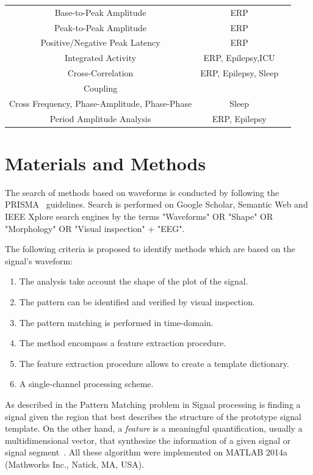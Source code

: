 \documentclass[brainsci,article,submit,moreauthors,pdftex,10pt,a4paper]{mdpi}
\begin{document}
\begin{table}[H]
\begin{tabular}{ccc}
Base-to-Peak Amplitude     & ERP  &  \citep{Cole2017} \\
Peak-to-Peak Amplitude     & ERP  &  \citep{Mak2012} \\
Positive/Negative Peak Latency                                 & ERP  & \citep{Mak2012}  \\
Integrated Activity               & ERP, Epilepsy,ICU & \citep{Uchida1999, Shah2015} \\
Cross-Correlation                & ERP, Epilepsy, Sleep & \citep{Cacioppo2007, Shah2015} \\
Coupling \\ Cross Frequency,  Phase-Amplitude, Phase-Phase     & Sleep & \citep{Cole2017} \\
Period Amplitude Analysis  & ERP, Epilepsy & \citep{Uchida1999,Cacioppo2007, Shah2015} \\
\bottomrule
\end{tabular}
\label{tab:results}
\end{table}


\section{Materials and Methods}

The search of methods based on waveforms is conducted by following the PRISMA~\citep{Moher2009} guidelines.  Search is performed on Google Scholar, Semantic Web and IEEE Xplore search engines by the terms "Waveforms" OR "Shape" OR "Morphology" OR "Visual inspection" + "EEG".

The following criteria is proposed to identify methods which are based on the signal's waveform:

\begin{enumerate}
\item The analysis take account the shape of the plot of the signal.
\item The pattern can be identified and verified by visual inspection.
\item The pattern matching is performed in time-domain.
\item The method encompass a feature extraction procedure.
\item The feature extraction procedure allows to create a template dictionary.
\item A single-channel processing scheme.
\end{enumerate}

As described in \citep{allen2004signal} the Pattern Matching problem in Signal processing is finding a signal given the region that best describes the structure of the prototype signal template.   On the other hand, a \textit{feature} is a meaningful quantification, usually a multidimensional vector, that synthesize the information of a given signal or signal segment~\citep{WolpawJonathanR2012}.   All these algorithm were implemented on MATLAB 2014a (Mathworks Inc., Natick, MA, USA). 
\end{document}
